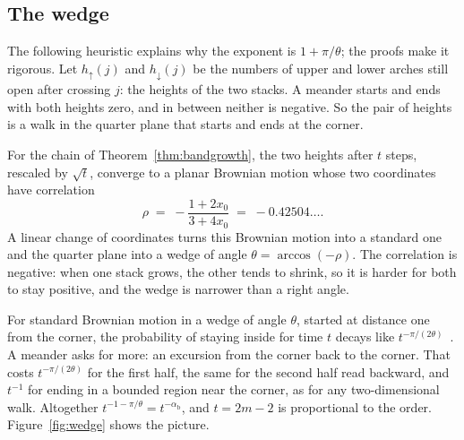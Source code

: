 \subsection{The wedge}

The following heuristic explains why the exponent is $1+\pi/\theta$; the proofs make it rigorous. Let $h_\uparrow(j)$ and $h_\downarrow(j)$ be the numbers of
upper and lower arches still open after crossing $j$: the heights of the two stacks. A meander starts
and ends with both heights zero, and in between neither is negative. So the pair of heights is a walk
in the quarter plane that starts and ends at the corner.

For the chain of Theorem~\ref{thm:bandgrowth}, the two heights after $t$ steps, rescaled by $\sqrt t$,
converge to a planar Brownian motion whose two coordinates have correlation
\[ \rho\;=\;-\frac{1+2x_0}{3+4x_0}\;=\;-0.42504\ldots . \]
A linear change of coordinates turns this Brownian motion into a standard one and the quarter plane
into a wedge of angle $\theta=\arccos(-\rho)$. The correlation is negative: when one stack grows, the
other tends to shrink, so it is harder for both to stay positive, and the wedge is narrower than a
right angle.

For standard Brownian motion in a wedge of angle $\theta$, started at distance one from the corner, the
probability of staying inside for time $t$ decays like $t^{-\pi/(2\theta)}$~\cite{DW}. A meander asks for
more: an excursion from the corner back to the corner. That costs $t^{-\pi/(2\theta)}$ for the first
half, the same for the second half read backward, and $t^{-1}$ for ending in a bounded region near the
corner, as for any two-dimensional walk. Altogether $t^{-1-\pi/\theta}=t^{-\alpha_{\mathrm b}}$, and
$t=2m-2$ is proportional to the order. Figure~\ref{fig:wedge} shows the picture.

